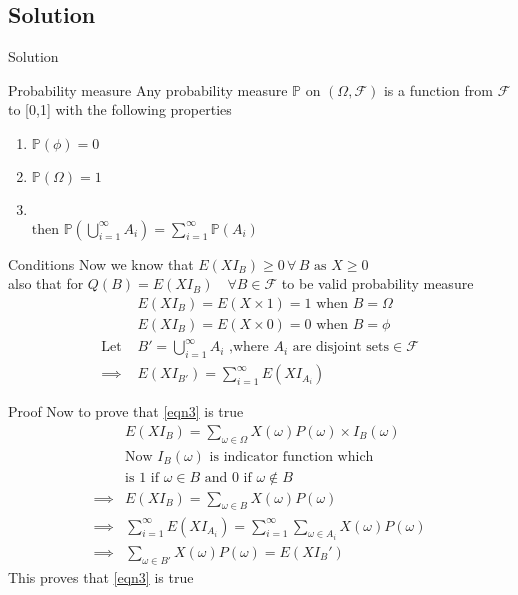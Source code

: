 \documentclass{beamer}
\begin{document}
\subsection{Solution}
\begin{frame}{Solution}
\begin{block}{Probability measure}
  Any probability measure \(\mathbb{P}\) on \((\Omega,\mathcal{F})\) is a function from \(\mathcal{F}\) to [0,1] with the following properties
\begin{enumerate}
   \item \(\mathbb{P}(\phi)=0 \)
   \item \(\mathbb{P}(\Omega)=1 \)
   \item {}\\
    \(\text{then } \mathbb{P}(\bigcup_{i=1}^{\infty} A_i)= \sum_{i=1}^{\infty} \mathbb{P}(A_i) \)
\end{enumerate}
\end{block}
\end{frame}
\begin{frame}
\begin{block}{Conditions}
Now we know that \(E(XI_B)\geq 0\, \forall\, B\text{ as } X\geq 0\)\\
also that for \(Q(B) =E(XI_B)\quad  \forall B \in \mathcal{F}\) to be valid probability measure
\begin{align}
& E(XI_B)=E(X\times 1)=1  \text{ when } B=\Omega \label{eqn1}\\ 
& E(XI_B)=E(X\times0)=0  \text{ when } B=\phi  \label{eqn2} \\ \nonumber
 \text{Let } &B'=\bigcup_{i=1}^{\infty} A_i \text{ ,where } A_i\text{ are disjoint sets}\in \mathcal{F}\\ 
\implies & E(XI_{B'})=\sum_{i=1}^{\infty} E(XI_{A_i}) \label{eqn3}
\end{align}
\end{block}
\end{frame}
\begin{frame}
\begin{block}{Proof}
Now to prove that \eqref{eqn3} is true
\begin{align}
& E(XI_B)=\sum_{\omega \in \Omega}{ X(\omega)P(\omega)\times I_B(\omega)}\\ \nonumber
&\text{Now \(I_B(\omega)\) is indicator function which}\\
&\text{is 1 if }\omega \in B \text{ and 0 if } \omega \notin  B\\
\implies & E(XI_B)=\sum_{\omega \in B} {X(\omega)P(\omega)}\\
\implies & \sum_{i=1}^{\infty} E(XI_{A_i})=\sum_{i=1}^{\infty} \sum_{\omega \in A_i}{X(\omega)P(\omega)}\\
\implies & \sum_{\omega \in B'}{X(\omega)P(\omega)}=E(XI_B')
\end{align} 
This proves that \eqref{eqn3} is true
\end{block}
\end{frame}
\end{document}
